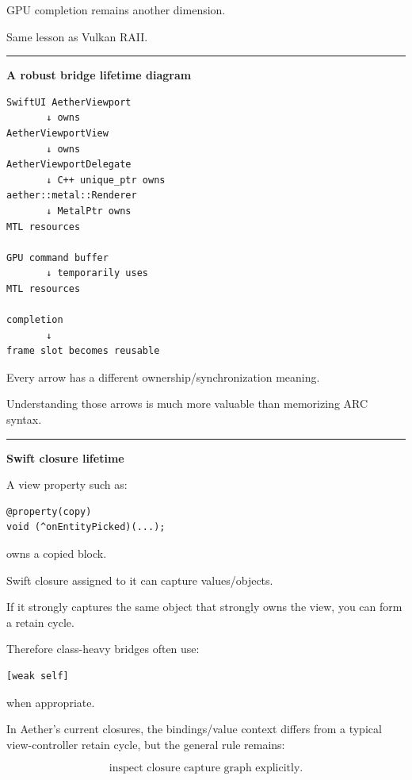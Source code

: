 GPU completion remains another dimension.

Same lesson as Vulkan RAII.

\begin{center}\rule{0.5\linewidth}{0.5pt}\end{center}

\textbf{A robust bridge lifetime diagram}

\begin{verbatim}
SwiftUI AetherViewport
       ↓ owns
AetherViewportView
       ↓ owns
AetherViewportDelegate
       ↓ C++ unique_ptr owns
aether::metal::Renderer
       ↓ MetalPtr owns
MTL resources

GPU command buffer
       ↓ temporarily uses
MTL resources

completion
       ↓
frame slot becomes reusable
\end{verbatim}

Every arrow has a different ownership/synchronization meaning.

Understanding those arrows is much more valuable than memorizing ARC syntax.

\begin{center}\rule{0.5\linewidth}{0.5pt}\end{center}

\textbf{Swift closure lifetime}

A view property such as:

\begin{verbatim}
@property(copy)
void (^onEntityPicked)(...);
\end{verbatim}

owns a copied block.

Swift closure assigned to it can capture values/objects.

If it strongly captures the same object that strongly owns the view, you can form a retain cycle.

Therefore class-heavy bridges often use:

\begin{verbatim}
[weak self]
\end{verbatim}

when appropriate.

In Aether's current  closures, the bindings/value context differs from a typical view-controller retain cycle, but the general rule remains:

\[
\boxed{
\text{inspect closure capture graph explicitly}.
}
\]

